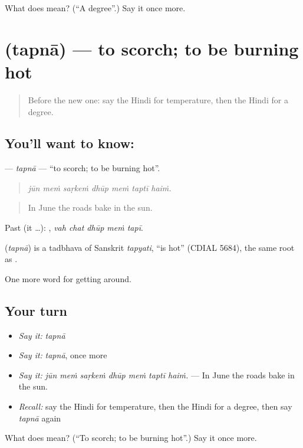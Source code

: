 \begin{tcolorbox}[breakable,colback=teal!4,colframe=teal!35!black,title={Before you move on}]
What does  mean? (\textquotedblleft{}A degree\textquotedblright{}.) Say it once more.
\end{tcolorbox}
\section[\texorpdfstring{\hi{तपना} (tapnā)}{तपना (tapnā)}]{ (tapnā) — to scorch; to be burning hot}

\label{lesson:HI-C439-tapna}



\begin{quote}
Before the new one: say the Hindi for temperature, then the Hindi for a degree.
\end{quote}

\subsection*{You'll want to know: }
\textbf{} — \emph{tapnā} — \textquotedblleft{}to scorch; to be burning hot\textquotedblright{}.

\begin{quote}
      
\end{quote}

\begin{quote}
\emph{jūn meṁ saṛkeṁ dhūp meṁ taptī haiṁ.}
\end{quote}

\begin{quote}
In June the roads bake in the sun.
\end{quote}

Past (it …):     , \emph{vah chat dhūp meṁ tapī}.

\begin{cousinweb}
\textbf{} (\emph{tapnā}) is a tadbhava of Sanskrit \emph{tapyati}, \textquotedblleft{}is hot\textquotedblright{} (CDIAL 5684), the same root as .
\end{cousinweb}

\begin{grammarlens}[title={What you've built}]
One more word for getting around.
\end{grammarlens}

\subsection*{Your turn}
\begin{itemize}
\raggedright
  \item \emph{Say it:} \emph{tapnā}
  \item \emph{Say it:} \emph{tapnā}, once more
  \item \emph{Say it:} \emph{jūn meṁ saṛkeṁ dhūp meṁ taptī haiṁ.} — In June the roads bake in the sun.
  \item \emph{Recall:} say the Hindi for temperature, then the Hindi for a degree, then say \emph{tapnā} again
\end{itemize}

\begin{tcolorbox}[breakable,colback=teal!4,colframe=teal!35!black,title={Before you move on}]
What does  mean? (\textquotedblleft{}To scorch; to be burning hot\textquotedblright{}.) Say it once more.
\end{tcolorbox}
